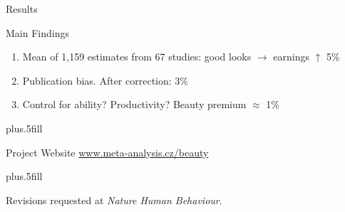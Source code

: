 \documentclass{beamer} %
\begin{document}
\begin{frame}{Results}
  \begin{block}{Main Findings}
  \begin{enumerate}
  \item
Mean of 1,159 estimates from 67 studies: good looks $\rightarrow$ earnings $\uparrow$ 5\%
\item
Publication bias. After correction: 3\%
    \item
Control for ability? Productivity? Beauty premium $\approx$ 1\%
  \end{enumerate}
  \end{block}

\vskip0pt plus.5fill
    \begin{block}{Project Website}
      \href{http://www.meta-analysis.cz/beauty}{www.meta-analysis.cz/beauty}
    \end{block}
		
		\vskip0pt plus.5fill
		
		Revisions requested at \emph{Nature Human Behaviour}.
		
\end{frame}
\end{document}
